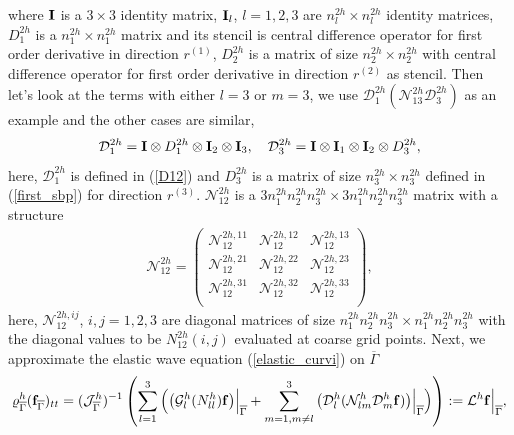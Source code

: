 where ${\bf I}$ is a $3\times3$ identity matrix, ${\bf I}_l$, $l = 1,2,3$ are $n_l^{2h}\times n_l^{2h}$ identity matrices, $D_1^{2h}$ is a $n_1^{2h}\times n_1^{2h}$ matrix and its stencil is central difference operator for first order derivative in direction $r^{(1)}$, $D_2^{2h}$ is a matrix of size $n_2^{2h}\times n_2^{2h}$ with central difference operator for first order derivative in direction $r^{(2)}$ as stencil. Then let's look at the terms with either $l = 3$ or $m = 3$, we use $\mathcal{D}_1^{2h}(\mathcal{N}_{13}^{2h}\mathcal{D}_3^{2h})$ as an example and the other cases are similar,
\begin{equation}\label{D13}
\mathcal{D}_1^{2h} = {\bf I}\otimes D_1^{2h} \otimes {\bf I}_2 \otimes {\bf I}_3,\ \ \ \mathcal{D}_3^{2h} ={\bf I}\otimes {\bf I}_1\otimes {\bf I}_2\otimes D_3^{2h},
\end{equation}
here, $\mathcal{D}_1^{2h}$ is defined in (\ref{D12}) and $D_3^{2h}$ is a matrix of size $n_3^{2h}\times n_3^{2h}$ defined in (\ref{first_sbp}) for direction $r^{(3)}$. $\mathcal{N}_{12}^{2h}$ is a $3n_1^{2h}n_2^{2h}n_3^{2h}\times3n_1^{2h}n_2^{2h}n_3^{2h}$ matrix with a structure
\begin{align}\label{N12}
\mathcal{N}_{12}^{2h}= \left(\begin{array}{ccc}
\mathscr{N}_{12}^{2h,11}&\mathscr{N}_{12}^{2h,12}& \mathscr{N}_{12}^{2h,13}\\
\mathscr{N}_{12}^{2h,21} & \mathscr{N}_{12}^{2h,22} & \mathscr{N}_{12}^{2h,23} \\
\mathscr{N}_{12}^{2h,31}&\mathscr{N}_{12}^{2h,32}&  \mathscr{N}_{12}^{2h,33}\\ \end{array}\right),
\end{align}
here, $\mathscr{N}_{12}^{2h,ij}$, $i,j = 1,2,3$ are diagonal matrices of size $n_1^{2h}n_2^{2h}n_3^{2h}\times n_1^{2h}n_2^{2h}n_3^{2h}$ with the diagonal values to be $N_{12}^{2h}(i,j)$ evaluated at coarse grid points. Next, we approximate the elastic wave equation (\ref{elastic_curvi}) on $\overline{\Gamma}$ 
\begin{equation}\label{elastic_semi_f}
\varrho^h_{\overline{\Gamma}} ({\bf f}_{\overline{\Gamma}})_{tt} =
( \mathcal{ J}_{\overline{\Gamma}}^{h})^{-1}\left(\sum_{l=1}^3\Big(\big(\mathcal{G}_l^{h}({N}_{ll}^h){\bf f}\big)\Big|_{\overline{\Gamma}}+\sum_{m=1,m\neq l}^3\big(\mathcal{D}_l^{h}(\mathcal{N}_{lm}^{h}\mathcal{D}_m^{h}{\bf f})\big)\Big|_{\overline{\Gamma}}\Big)\right) := \mathcal{L}^h{\bf f}\Big|_{\overline{\Gamma}},
\end{equation}

